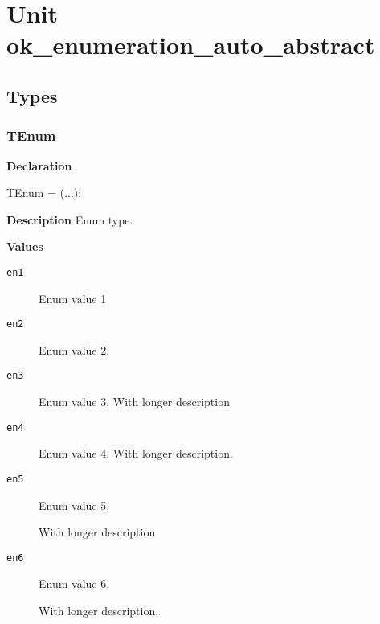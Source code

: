 \documentclass{report}
\newif\ifpdf
\begin{document}
\label{toc}\tableofcontents
\newpage
\newlength{\tmplength}
\chapter{Unit ok{\_}enumeration{\_}auto{\_}abstract}
\label{ok_enumeration_auto_abstract}
\section{Types}
\ifpdf
\subsection*{\large{\textbf{TEnum}}\normalsize\hspace{1ex}\hrulefill}
\else
\subsection*{TEnum}
\fi
\label{ok_enumeration_auto_abstract-TEnum}
\begin{list}{}{
\setlength{\itemindent}{0cm}
\setlength{\listparindent}{0cm}
\setlength{\leftmargin}{\evensidemargin}
\addtolength{\leftmargin}{\tmplength}
\settowidth{\labelsep}{X}
\addtolength{\leftmargin}{\labelsep}
\setlength{\labelwidth}{\tmplength}
}
\item[\textbf{Declaration}\hfill]
\ifpdf
\begin{flushleft}
\fi
\begin{ttfamily}
TEnum = (...);\end{ttfamily}

\ifpdf
\end{flushleft}
\fi

\par
\item[\textbf{Description}]
Enum type.\item[\textbf{Values}]
\begin{description}
\item[\texttt{en1}] \label{ok_enumeration_auto_abstract-en1}
\index{}
Enum value 1
\item[\texttt{en2}] \label{ok_enumeration_auto_abstract-en2}
\index{}
Enum value 2.
\item[\texttt{en3}] \label{ok_enumeration_auto_abstract-en3}
\index{}
Enum value 3. With longer description
\item[\texttt{en4}] \label{ok_enumeration_auto_abstract-en4}
\index{}
Enum value 4. With longer description.
\item[\texttt{en5}] \label{ok_enumeration_auto_abstract-en5}
\index{}
Enum value 5.

With longer description
\item[\texttt{en6}] \label{ok_enumeration_auto_abstract-en6}
\index{}
Enum value 6.

With longer description.
\end{description}


\end{list}
\end{document}
